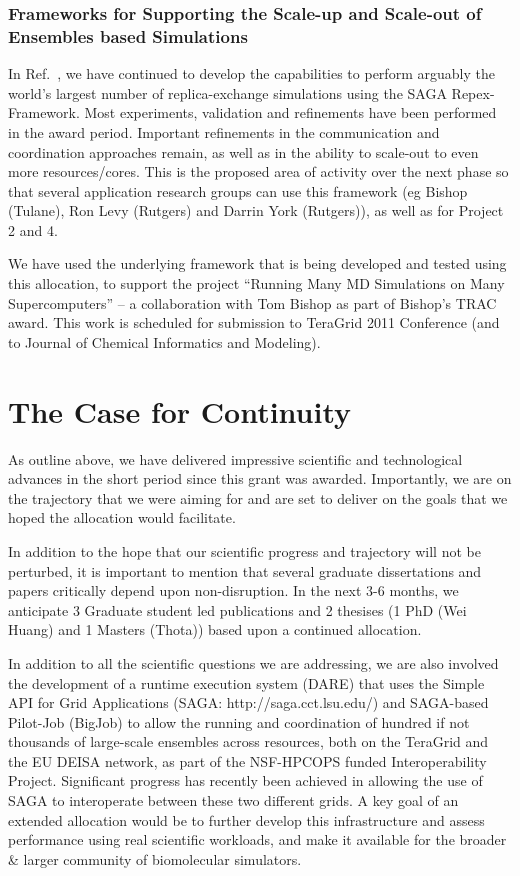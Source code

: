 \documentclass[a4paper,10pt]{article}
\begin{document}
\subsubsection{Frameworks for Supporting the Scale-up and Scale-out of Ensembles based Simulations}

In Ref.~\cite{async-re}, we have continued to develop the capabilities to perform arguably the world's largest number of replica-exchange simulations using the SAGA Repex-Framework. Most experiments, validation and refinements have been performed in the award period. Important refinements in the communication and coordination approaches remain, as well as in the ability to scale-out to even more resources/cores. This is the proposed area of activity over the next phase so that several application research groups can use this framework (eg Bishop (Tulane), Ron Levy (Rutgers) and Darrin York (Rutgers)), as well as for Project 2 and 4.

We have used the underlying framework that is being developed and
tested using this allocation, to support the project ``Running Many MD
Simulations on Many Supercomputers'' -- a collaboration with Tom
Bishop as part of Bishop's TRAC award. This work is scheduled for
submission to TeraGrid 2011 Conference (and to Journal of Chemical
Informatics and Modeling).


\section{The Case for Continuity}

As outline above, we have delivered impressive scientific and technological advances in the short period since this grant was awarded. Importantly, we are on the trajectory that we were aiming for and are set to deliver on the goals that we hoped the allocation would facilitate.

In addition to the hope that our scientific progress and trajectory will not be perturbed, it is important to mention that several graduate dissertations and papers critically depend upon non-disruption. In the next 3-6 months, we anticipate 3 Graduate student led publications and 2 thesises (1 PhD (Wei Huang) and 1 Masters (Thota)) based upon a continued allocation.

In addition to all the scientific questions we are addressing, we are also involved the development of a runtime execution system (DARE) that uses the Simple API for Grid Applications (SAGA: http://saga.cct.lsu.edu/) and SAGA-based Pilot-Job (BigJob) to allow the running and coordination of hundred if not thousands of large-scale ensembles across resources, both on the TeraGrid and the EU DEISA network, as part of the NSF-HPCOPS funded Interoperability Project. Significant progress has recently been achieved in allowing the use of SAGA to interoperate between these two different grids.  A key goal of an extended allocation would be to further develop this infrastructure and assess performance using real scientific workloads, and make it available for the broader \& larger community of biomolecular simulators.
\end{document}
